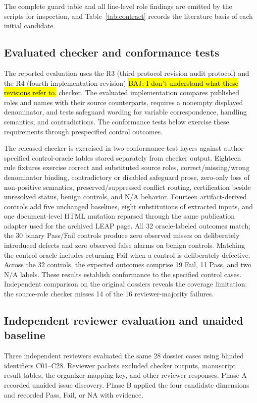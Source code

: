 \documentclass[a4paper,fleqn]{cas-dc}
\newcommand{\baj}[1]{{\sethlcolor{yellow}\hl{BAJ: #1}}}
\begin{document}
The complete guard table and all line-level role findings are emitted by the scripts for inspection, and Table~\ref{tab:contract} records the literature basis of each initial candidate.

\subsection{Evaluated checker and conformance tests}
The reported evaluation uses the R3 (third protocol revision audit protocol) and the R4 (fourth implementation revision) \baj{I don't understand what these revisions refer to.} checker. The evaluated implementation compares published roles and names with their source counterparts, requires a nonempty displayed denominator, and tests safeguard wording for variable correspondence, handling semantics, and contradictions. The conformance tests below exercise these requirements through prespecified control outcomes.

The released checker is exercised in two conformance-test layers against author-specified control-oracle tables stored separately from checker output. Eighteen rule fixtures exercise correct and substituted source roles, correct/missing/wrong denominator binding, contradictory or disabled safeguard prose, zero-only loss of non-positive semantics, preserved/suppressed conflict routing, certification beside unresolved status, benign controls, and N/A behavior. Fourteen artifact-derived controls add five unchanged baselines, eight substitutions of extracted inputs, and one document-level HTML mutation reparsed through the same publication adapter used for the archived LEAP page. All 32 oracle-labeled outcomes match; the 30 binary Pass/Fail controls produce zero observed misses on deliberately introduced defects and zero observed false alarms on benign controls. Matching the control oracle includes returning Fail when a control is deliberately defective. Across the 32 controls, the expected outcomes comprise 19 Fail, 11 Pass, and two N/A labels. These results establish conformance to the specified control cases. Independent comparison on the original dossiers reveals the coverage limitation: the source-role checker misses 14 of the 16 reviewer-majority failures.


\subsection{Independent reviewer evaluation and unaided baseline}
Three independent reviewers evaluated the same 28 dossier cases using blinded identifiers C01--C28. Reviewer packets excluded checker outputs, manuscript result tables, the organizer mapping key, and other reviewer responses. Phase A recorded unaided issue discovery. Phase B applied the four candidate dimensions and recorded Pass, Fail, or NA with evidence.
\end{document}
